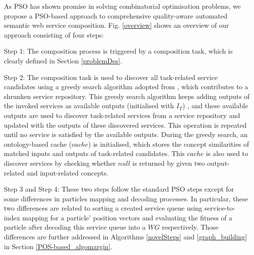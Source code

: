 \documentclass{llncs}
\begin{document}
As PSO has shown promise in solving combinatorial optimisation problems, we propose a PSO-based approach to comprehensive quality-aware automated semantic web service composition. Fig. \ref{overview} shows an overview of our approach consisting of four steps: 

Step 1: The composition process is triggered by a composition task, which is clearly defined in Section \ref{problemDes}. 

Step 2: The composition task is used to discover all task-related service candidates using a greedy search algorithm adopted from \cite{ma2015hybrid}, which contributes to a shrunken service repository. This greedy search algorithm keeps adding outputs of the invoked services as available outputs (initialised with $I_{T}$) , and these available outputs are used to discover task-related services from a service repository and updated with the outputs of these discovered services. This operation is repeated until no service is satisfied by the available outputs. During the greedy search, an ontology-based cache ($cache$) is initialised, which stores the concept similarities of matched inputs and outputs of task-related candidates. This $cache$ is also used to discover services by checking whether $null$ is returned by given two output-related and input-related concepts.

Step 3 and Step 4: These two steps follow the standard PSO steps \cite{shi2001particle} except for some differences in particles mapping and decoding processes. In particular, these two differences are related to sorting a created service queue using service-to-index mapping for a particle' position vectors and evaluating the fitness of a particle after decoding this service queue into a $WG$ respectively. Those differences are further addressed in Algorithms \ref{novelSteps} and \ref{graph_building} in Section \ref{POS-based_algomargin}.
\end{document}
